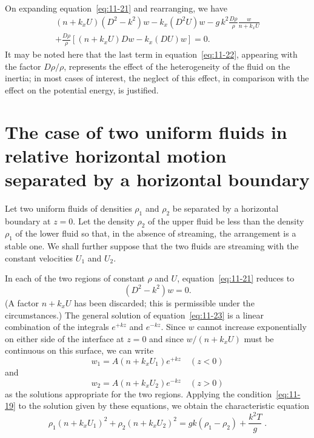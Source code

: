 On expanding equation~\eqref{eq:11-21} and rearranging, we have
\begin{multline}
\label{eq:11-22}
(n+k_x U)(D^2-k^2)w - k_x(D^2U)w - g\,k^2\frac{D\rho}{\rho}\frac{w}{n+k_x U} \\
+ \frac{D\rho}{\rho}\!\left[(n+k_x U)Dw - k_x(DU)w\right] = 0.
\end{multline}
It may be noted here that the last term in equation~\eqref{eq:11-22}, appearing with the factor $D\rho/\rho$, represents the effect of the heterogeneity of the fluid on the inertia; in most cases of interest, the neglect of this effect, in comparison with the effect on the potential energy, is justified.

\section{The case of two uniform fluids in relative horizontal motion separated by a horizontal boundary}\label{sec:101}

Let two uniform fluids of densities $\rho_1$ and $\rho_2$ be separated by a horizontal boundary at $z = 0$. Let the density $\rho_2$ of the upper fluid be less than the density $\rho_1$ of the lower fluid so that, in the absence of streaming, the arrangement is a stable one. We shall further suppose that the two fluids are streaming with the constant velocities $U_1$ and $U_2$.

In each of the two regions of constant $\rho$ and $U$, equation~\eqref{eq:11-21} reduces to
\begin{equation}
\label{eq:11-23}
(D^2-k^2)w = 0.
\end{equation}
(A factor $n+k_x U$ has been discarded; this is permissible under the circumstances.) The general solution of equation~\eqref{eq:11-23} is a linear combination of the integrals $e^{+kz}$ and $e^{-kz}$. Since $w$ cannot increase exponentially on either side of the interface at $z = 0$ and since $w/(n+k_x U)$ must be continuous on this surface, we can write
\begin{equation}
\label{eq:11-24}
w_1 = A(n+k_x U_1)e^{+kz} \quad (z < 0)
\end{equation}
and
\begin{equation}
\label{eq:11-25}
w_2 = A(n+k_x U_2)e^{-kz} \quad (z > 0)
\end{equation}
as the solutions appropriate for the two regions. Applying the condition~\eqref{eq:11-19} to the solution given by these equations, we obtain the characteristic equation
\begin{equation}
\label{eq:11-26}
\rho_1(n+k_x U_1)^2 + \rho_2(n+k_x U_2)^2 = gk\!\left(\rho_1-\rho_2\right) + \frac{k^2 T}{g}\;.
\end{equation}

